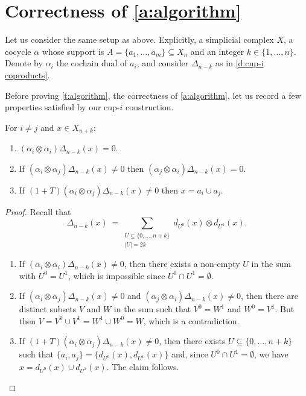 
\section{Correctness of \cref{a:algorithm}} \label{s:correctness}

Let us consider the same setup as above. Explicitly, a simplicial complex $X$, a cocycle $\alpha$ whose support is $A = \{a_1, \dots, a_m\} \subseteq X_n$ and an integer $k \in \{1, \dots, n\}$.
Denote by $\alpha_i$ the cochain dual of $a_i$, and consider
$\Delta_{n-k}$ as in \cref{d:cup-i coproducts}.

Before proving \cref{t:algorithm}, the correctness of \cref{a:algorithm}, let us record a few properties satisfied by our cup-$i$ construction.

\begin{lemma} \label{l:freeness}
	For $i \neq j$ and $x \in X_{n+k}$:
	\begin{enumerate}
		\item $(\alpha_i \otimes \alpha_i)\Delta_{n-k}(x) = 0$.
		\item If $(\alpha_i \otimes \alpha_j)\Delta_{n-k}(x) \neq 0$ then $(\alpha_j \otimes \alpha_i)\Delta_{n-k}(x) = 0$.
		\item If $(1+T)(\alpha_i \otimes \alpha_j)\Delta_{n-k}(x) \neq 0$ then $x = a_i \cup a_j$.
	\end{enumerate}
\end{lemma}

\begin{proof}
	Recall that
	\begin{equation*}
	\Delta_{n-k}(x) \ = \! \sum_{\substack{U \subseteq \{0, \dots, n+k\} \\ \vert U \vert = 2k}}
	d_{U^0}(x) \otimes d_{U^1}(x).
	\end{equation*}

	\begin{enumerate}
		\item If $(\alpha_i \otimes \alpha_i)\Delta_{n-k}(x) \neq 0$, then there exists a non-empty $U$ in the sum with $U^0 = U^1$, which is impossible since $U^0 \cap U^1 = \emptyset$.

		\item If $(\alpha_i \otimes \alpha_j)\Delta_{n-k}(x) \neq 0$ and $(\alpha_j \otimes \alpha_i)\Delta_{n-k}(x) \neq 0$, then there are distinct subsets $V$ and $W$ in the sum such that $V^0 = W^1$ and $W^0 = V^1$.
		But then $V = V^0 \cup V^1 = W^1 \cup W^0 = W$, which is a contradiction.

		\item If $(1+T)(\alpha_i \otimes \alpha_j)\Delta_{n-k}(x) \neq 0$, then there exists $U \subseteq \{0, \dots, n+k\}$ such that $\{a_i, a_j\} = \{d_{U^0}(x), d_{U^1}(x)\}$ and, since $U^0 \cap U^1 = \emptyset$, we have $x = d_{U^0}(x) \cup d_{U^1}(x)$.
		The claim follows.
	\end{enumerate}
\end{proof}

